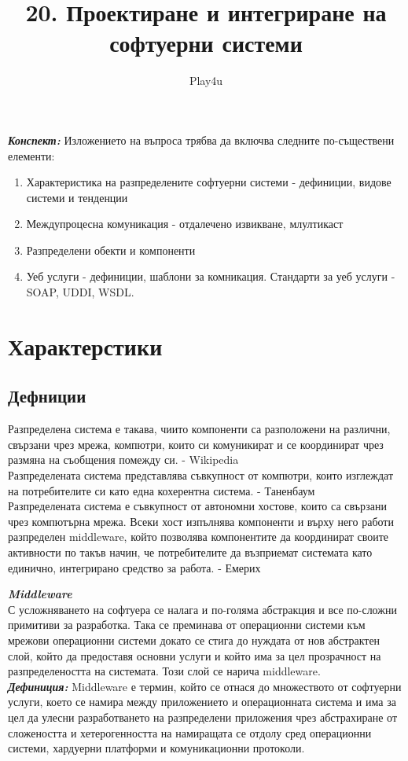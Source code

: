 \documentclass[11pt]{article} %
\title{20. Проектиране и интегриране на софтуерни системи}
\author{Play4u}
\newcommand{\italicBold}[1]{\textbf{\emph{#1}}}
\newcommand{\definition}{\italicBold{Дефиниция: }}
\newcommand{\enumNum}{\renewcommand{\theenumi}{\arabic{enumi}}}
\begin{document}
\maketitle

\italicBold{Конспект: } Изложението на въпроса трябва да включва следните по-съществени елементи:

\enumNum
\begin{enumerate}[noitemsep]
	\item Характеристика на разпределените софтуерни системи - дефиниции, видове системи и тенденции
	\item Междупроцесна комуникация - отдалечено извикване, млултикаст
	\item Разпределени обекти и компоненти
	\item Уеб услуги - дефиниции, шаблони за комникация. Стандарти за уеб услуги - SOAP, UDDI, WSDL.\\\par
\end{enumerate}


\section{Характерстики}
\subsection{Дефниции}
Разпределена система е такава, чиито компоненти са разположени на различни, свързани чрез мрежа, компютри, които си комуникират и се координират чрез размяна на съобщения помежду си. - Wikipedia\\
Разпределената система представлява съвкупност от компютри, които изглеждат на потребителите си като една кохерентна система. - Таненбаум\\
Разпределената система е съвкупност от автономни хостове, които са свързани чрез компютърна мрежа. Всеки хост изпълнява компоненти и върху него работи разпределен middleware, който позволява компонентите да координират своите активности по такъв начин, че потребителите да възприемат системата като единично, интегрирано средство за работа. - Емерих\\\par

\italicBold{Middleware}\\
С усложняването на софтуера се налага и по-голяма абстракция и все по-сложни примитиви за разработка. Така се преминава от операционни системи към мрежови операционни системи докато се стига до нуждата от нов абстрактен слой, който да предоставя основни услуги и който има за цел прозрачност на разпределеността на системата. Този слой се нарича middleware.\\
\definition Middleware е термин, който се отнася до множеството от софтуерни услуги, което се намира между приложението и операционната система и има за цел да улесни разработването на разпределени приложения чрез абстрахиране от сложеността и хетерогенността на намиращата се отдолу сред операционни системи, хардуерни платформи и комуникационни протоколи.\\\par
\end{document}
